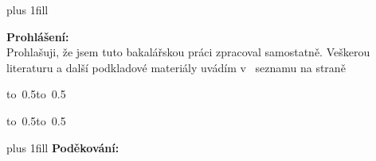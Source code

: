 \documentclass[12pt,a4paper]{report}
\begin{document}
\vglue 0pt plus 1fill

\noindent
{\bfseries Prohlášení:} \\
Prohlašuji, že jsem tuto bakalářskou práci zpracoval samostatně. Veškerou literaturu a další podkladové materiály uvádím v~ seznamu na straně~%

\vspace{10mm}

\hbox{\hbox to 0.5\hbox to 0.5}

\vspace{1mm}
\hbox{\hbox to 0.5\hsize{%

\hss}\hbox to 0.5}

\vspace{20mm}

\newpage

\vglue 0pt plus 1fill
\noindent
{\bfseries Poděkování:} \\

\vspace{10mm}

\newpage
\end{document}
